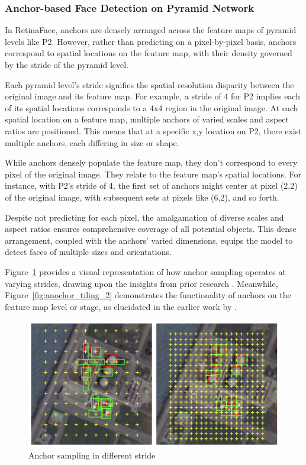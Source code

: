 \documentclass{article}
\begin{document}
\subsubsection{Anchor-based Face Detection on Pyramid Network}

In RetinaFace, anchors are densely arranged across the feature maps of pyramid levels like P2. However, rather than predicting on a pixel-by-pixel basis, anchors correspond to spatial locations on the feature map, with their density governed by the stride of the pyramid level.

Each pyramid level's stride signifies the spatial resolution disparity between the original image and its feature map. For example, a stride of 4 for P2 implies each of its spatial locations corresponds to a 4x4 region in the original image. At each spatial location on a feature map, multiple anchors of varied scales and aspect ratios are positioned. This means that at a specific x,y location on P2, there exist multiple anchors, each differing in size or shape.

While anchors densely populate the feature map, they don't correspond to every pixel of the original image. They relate to the feature map's spatial locations. For instance, with P2's stride of 4, the first set of anchors might center at pixel (2,2) of the original image, with subsequent sets at pixels like (6,2), and so forth.

Despite not predicting for each pixel, the amalgamation of diverse scales and aspect ratios ensures comprehensive coverage of all potential objects. This dense arrangement, coupled with the anchors' varied dimensions, equips the model to detect faces of multiple sizes and orientations.

Figure~\ref{fig:anochor_tiling_1} provides a visual representation of how anchor sampling operates at varying strides, drawing upon the insights from prior research \cite{yan2019iou}. 
Meanwhile, Figure~\ref{fig:anochor_tiling_2} demonstrates the functionality of anchors on the feature map level or stage, as elucidated in the earlier work by \cite{vo2022review}.

\begin{figure}[h]
  \centering
  \includegraphics[width=0.7\linewidth]{images/anochor_tiling_1}
  \caption{Anchor sampling in different stride}
  \label{fig:anochor_tiling_1}
\end{figure}
\end{document}
